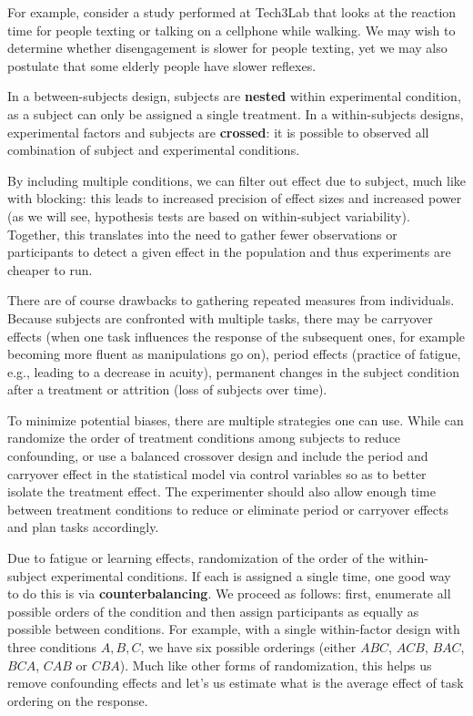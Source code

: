 \documentclass[
  11pt,
  letterpaper,
]{scrbook}
\theoremstyle{definition}
\theoremstyle{remark}
\begin{document}
For example, consider a study performed at Tech3Lab that looks at the
reaction time for people texting or talking on a cellphone while
walking. We may wish to determine whether disengagement is slower for
people texting, yet we may also postulate that some elderly people have
slower reflexes.

In a between-subjects design, subjects are \textbf{nested} within
experimental condition, as a subject can only be assigned a single
treatment. In a within-subjects designs, experimental factors and
subjects are \textbf{crossed}: it is possible to observed all
combination of subject and experimental conditions.

By including multiple conditions, we can filter out effect due to
subject, much like with blocking: this leads to increased precision of
effect sizes and increased power (as we will see, hypothesis tests are
based on within-subject variability). Together, this translates into the
need to gather fewer observations or participants to detect a given
effect in the population and thus experiments are cheaper to run.

There are of course drawbacks to gathering repeated measures from
individuals. Because subjects are confronted with multiple tasks, there
may be carryover effects (when one task influences the response of the
subsequent ones, for example becoming more fluent as manipulations go
on), period effects (practice of fatigue, e.g., leading to a decrease in
acuity), permanent changes in the subject condition after a treatment or
attrition (loss of subjects over time).

To minimize potential biases, there are multiple strategies one can use.
While can randomize the order of treatment conditions among subjects to
reduce confounding, or use a balanced crossover design and include the
period and carryover effect in the statistical model via control
variables so as to better isolate the treatment effect. The experimenter
should also allow enough time between treatment conditions to reduce or
eliminate period or carryover effects and plan tasks accordingly.

Due to fatigue or learning effects, randomization of the order of the
within-subject experimental conditions. If each is assigned a single
time, one good way to do this is via \textbf{counterbalancing}. We
proceed as follows: first, enumerate all possible orders of the
condition and then assign participants as equally as possible between
conditions. For example, with a single within-factor design with three
conditions \(A, B, C\), we have six possible orderings (either \(ABC\),
\(ACB\), \(BAC\), \(BCA\), \(CAB\) or \(CBA\)). Much like other forms of
randomization, this helps us remove confounding effects and let's us
estimate what is the average effect of task ordering on the response.
\end{document}
